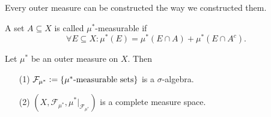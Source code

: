 \documentclass[11pt,a4paper]{article}
\begin{document}
\begin{remark}
  Every outer measure can be constructed the way we constructed them.
\end{remark}

\begin{definition}
  A set $A \subseteq X$ is called $\mu^*$-measurable if
  \[
    \forall E \subseteq X \colon
    \mu^*(E) = \mu^*(E \cap A) + \mu^*(E \cap A^c).
  \]
\end{definition}

\begin{theorem}
  Let $\mu^*$ be an outer measure on $X$. Then
  \begin{enumerate}
    \item[(1)] $\mathcal F_{\mu^*} := \set{\mu^*\text{-measurable sets}}$ is a 
      $\sigma$-algebra.
    \item[(2)] $(X, \mathcal F_{\mu^*}, \mu^*\vert_{\mathcal F_{\mu^*}})$
      is a complete measure space.
  \end{enumerate}
\end{theorem}
\begin{remark}

\end{remark}

\end{document}
